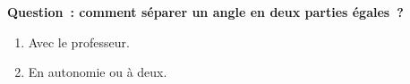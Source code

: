 \documentclass[activite]{thedocument}
\begin{document}
\textbf{\Large Question~: comment séparer un angle en deux parties égales~?}
\begin{enumerate}
    \item Avec le professeur.
    \begin{center}
        \vskip75pt
    \end{center}
    \item En autonomie ou à deux.
    \begin{center}
        \vskip75pt
    \end{center}
\end{enumerate}
\end{document}
